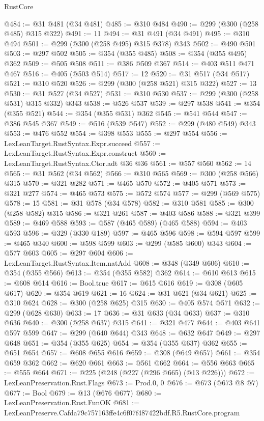 \begin{lexlean}{RustCore}
\begin{coremodule}
@484 := @31 @481 (@34 @481)
@485 := @310 @484
@490 := @299 (@300 (@258 @485) @315 @322)
@491 := 11
@494 := @31 @491 (@34 @491)
@495 := @310 @494
@501 := @299 (@300 (@258 @495) @315 @378) @343
@502 := @490 @501
@503 := @297 @502
@505 := @354 (@355 @485)
@508 := @354 (@355 @495) @362
@509 := @505 @508
@511 := @386 @509 @367
@514 := @403 @511 @471 @467
@516 := @405 (@503 @514)
@517 := 12
@520 := @31 @517 (@34 @517)
@521 := @310 @520
@526 := @299 (@300 (@258 @521) @315 @322)
@527 := 13
@530 := @31 @527 (@34 @527)
@531 := @310 @530
@537 := @299 (@300 (@258 @531) @315 @332) @343
@538 := @526 @537
@539 := @297 @538
@541 := @354 (@355 @521)
@544 := @354 (@355 @531) @362
@545 := @541 @544
@547 := @386 @545 @367
@549 := @516 (@539 @547)
@552 := @299 (@480 @549) @343
@553 := @476 @552
@554 := @398 @553
@555 := @297 @554
@556 := LexLeanTarget.RustSyntax.Expr.succeed
@557 := LexLeanTarget.RustSyntax.Expr.construct
@560 := LexLeanTarget.RustSyntax.Ctor.adt @36 @36
@561 := @557 @560
@562 := 14
@565 := @31 @562 (@34 @562)
@566 := @310 @565
@569 := @300 (@258 @566) @315
@570 := @321 @282
@571 := @465 @570
@572 := @405 @571
@573 := @321 @277
@574 := @465 @573
@575 := @572 @574
@577 := @299 (@569 @575)
@578 := 15
@581 := @31 @578 (@34 @578)
@582 := @310 @581
@585 := @300 (@258 @582) @315
@586 := @321 @261
@587 := @403 @586
@588 := @321 @399
@589 := @469 @588
@593 := @587 (@465 @589) (@465 @588)
@594 := @403 @593
@596 := @329 (@330 @189)
@597 := @465 @596
@598 := @594 @597
@599 := @465 @340
@600 := @598 @599
@603 := @299 (@585 @600) @343
@604 := @577 @603
@605 := @297 @604
@606 := LexLeanTarget.RustSyntax.Item.natAdd
@608 := @348 (@349 @606)
@610 := @354 (@355 @566)
@613 := @354 (@355 @582) @362
@614 := @610 @613
@615 := @608 @614
@616 := Bool.true
@617 := @615 @616
@619 := @308 (@605 @617)
@620 := @354 @619
@621 := 16
@624 := @31 @621 (@34 @621)
@625 := @310 @624
@628 := @300 (@258 @625) @315
@630 := @405 @574 @571
@632 := @299 (@628 @630)
@633 := 17
@636 := @31 @633 (@34 @633)
@637 := @310 @636
@640 := @300 (@258 @637) @315
@641 := @321 @477
@644 := @403 @641 @597 @599
@647 := @299 (@640 @644) @343
@648 := @632 @647
@649 := @297 @648
@651 := @354 (@355 @625)
@654 := @354 (@355 @637) @362
@655 := @651 @654
@657 := @608 @655 @616
@659 := @308 (@649 @657)
@661 := @354 @659 @362
@662 := @620 @661
@663 := @561 @662
@664 := @556 @663
@665 := @555 @664
@671 := @225 (@248 (@227 (@296 @665) (@13 @226)))
@672 := LexLeanPreservation.Rust.Flags
@673 := Prod.{0, 0}
@676 := @673 (@673 @8 @7)
@677 := Bool
@679 := @13 (@676 @677)
@680 := LexLeanPreservation.Rust.FunOK
@681 := LexLeanPreserve.Cafda79c757163ffe4c6f07f487422bdf.R5.RustCore.program

\end{coremodule}
\end{lexlean}
